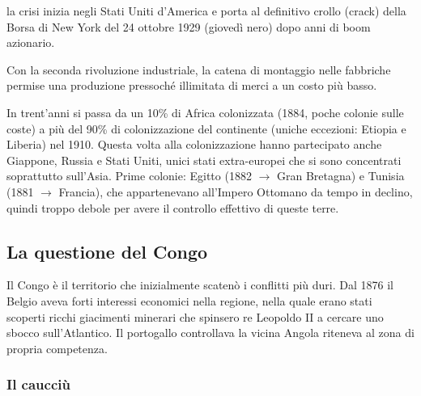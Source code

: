 \documentclass[a4paper]{article}
\begin{document}
la crisi inizia negli Stati Uniti d'America e porta al definitivo crollo
(crack) della Borsa di New York del 24 ottobre 1929 (giovedì nero) dopo anni di boom azionario. 

Con la seconda rivoluzione industriale, la catena di montaggio nelle fabbriche
permise una produzione pressoché illimitata di merci a un costo più basso.

In trent'anni si passa da un 10\% di Africa colonizzata (1884, poche colonie sulle coste)
a più del 90\% di
colonizzazione del continente (uniche eccezioni: Etiopia e Liberia) nel 1910.
Questa volta alla colonizzazione hanno partecipato anche Giappone, Russia e Stati Uniti, unici stati
extra-europei che si sono concentrati soprattutto sull'Asia.
Prime colonie: Egitto (1882 \(\rightarrow\) Gran Bretagna) e Tunisia (1881 \(\rightarrow\) Francia), che appartenevano
all'Impero Ottomano da tempo in declino, quindi troppo debole per avere il controllo effettivo di
queste terre.

\subsection{La questione del Congo}


Il Congo è il territorio che inizialmente scatenò i conflitti più duri.
Dal 1876 il Belgio aveva forti interessi economici nella regione, nella quale
erano stati scoperti ricchi giacimenti minerari che spinsero re Leopoldo II a cercare
uno sbocco sull'Atlantico. Il portogallo controllava la vicina Angola riteneva al zona di propria competenza.

\subsubsection{Il caucciù}
\end{document}
